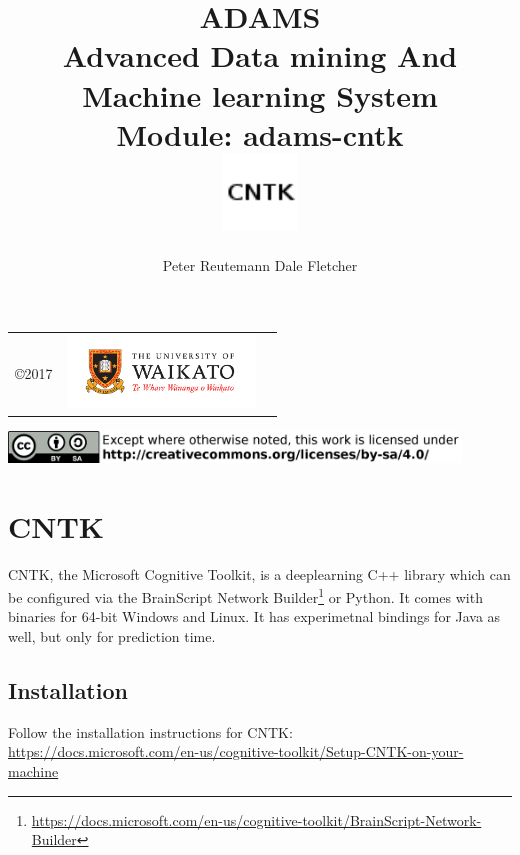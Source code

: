 \documentclass[a4paper]{book}
\title{
  \textbf{ADAMS} \\
  {\Large \textbf{A}dvanced \textbf{D}ata mining \textbf{A}nd \textbf{M}achine
  learning \textbf{S}ystem} \\
  {\Large Module: adams-cntk} \\
  \vspace{1cm}
  \includegraphics[width=2cm]{images/cntk-module.png} \\
}
\author{
  Peter Reutemann
  Dale Fletcher
}
\begin{document}
\begin{titlepage}
\maketitle

\thispagestyle{empty}
\center
\begin{table}[b]
	\begin{tabular}{c l l}
		\parbox[c][2cm]{2cm}{\copyright 2017} &
		\parbox[c][2cm]{5cm}{\includegraphics[width=5cm]{images/coat_of_arms.pdf}} \\
	\end{tabular}
	\includegraphics[width=12cm]{images/cc.png} \\
\end{table}

\end{titlepage}

\tableofcontents

\chapter{CNTK}
CNTK, the Microsoft Cognitive Toolkit\cite{cntk}, is a deeplearning C++
library which can be configured via the BrainScript Network
Builder\footnote{\url{https://docs.microsoft.com/en-us/cognitive-toolkit/BrainScript-Network-Builder}{}}
or Python. It comes with binaries for 64-bit Windows and Linux. It has
experimetnal bindings for Java as well, but only for prediction time.

\section{Installation}
Follow the installation instructions for CNTK: \\
\url{https://docs.microsoft.com/en-us/cognitive-toolkit/Setup-CNTK-on-your-machine}{} \\
\end{document}
